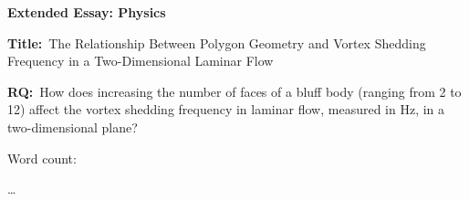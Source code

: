 \documentclass[12pt]{article}
\begin{document}
\begin{titlepage}
	\begin{center}
		\textbf{Extended Essay: Physics}
		
		\vspace*{4cm}
		
		\textbf{Title:}\
		The Relationship Between Polygon Geometry and Vortex Shedding Frequency in a Two-Dimensional Laminar Flow
		\vspace{1cm}
		
		\textbf{RQ:}\
		How does increasing the number of faces of a bluff body (ranging from 2 to 12) affect the vortex shedding frequency in laminar flow, measured in Hz, in a two-dimensional plane?
		\vspace{4cm}
		
		Word count:
		
		\ldots
		\vfill
		
		\vspace{0.1cm}
	\end{center}
\end{titlepage}
	
	
\tableofcontents
\newpage
	



\printbibliography
	
\end{document}
